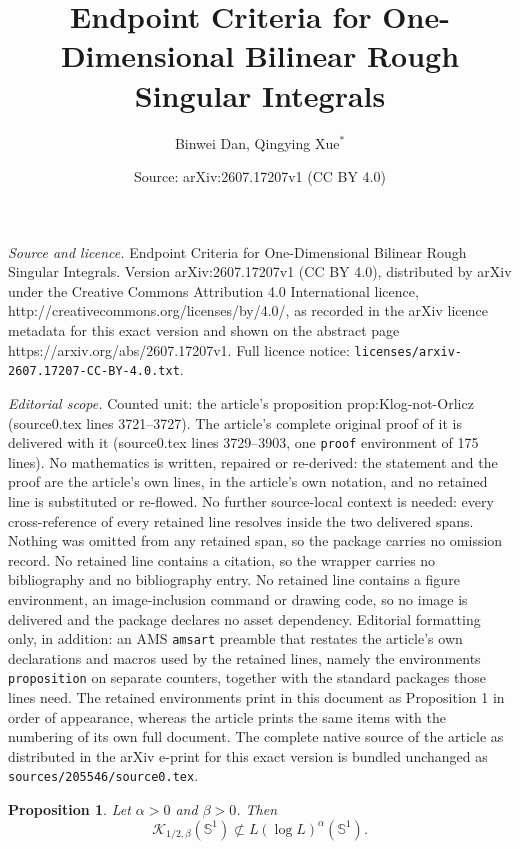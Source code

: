 \documentclass[10pt,a4paper]{amsart}
\title{Endpoint Criteria for One-Dimensional Bilinear Rough Singular Integrals}
\author{Binwei Dan, Qingying Xue\(^{*}\)}
\date{Source: arXiv:2607.17207v1 (CC BY 4.0)}
\newtheorem{proposition}{Proposition}
\newcommand{\Sph}{\mathbb S^1}
\newcommand{\cK}{\mathcal K}
\begin{document}
\maketitle

\noindent\emph{Source and licence.} Endpoint Criteria for One-Dimensional Bilinear Rough Singular Integrals. Version arXiv:2607.17207v1 (CC BY 4.0), distributed by arXiv under the Creative Commons Attribution 4.0 International licence, http://creativecommons.org/licenses/by/4.0/, as recorded in the arXiv licence metadata for this exact version and shown on the abstract page https://arxiv.org/abs/2607.17207v1. Full licence notice: \texttt{licenses/arxiv-2607.17207-CC-BY-4.0.txt}.\par\smallskip

\noindent\textit{Editorial scope.} Counted unit: the article's proposition prop:Klog-not-Orlicz (source0.tex lines 3721--3727). The article's complete original proof of it is delivered with it (source0.tex lines 3729--3903, one \texttt{proof} environment of 175 lines). No mathematics is written, repaired or re-derived: the statement and the proof are the article's own lines, in the article's own notation, and no retained line is substituted or re-flowed.  No further source-local context is needed: every cross-reference of every retained line resolves inside the two delivered spans.  Nothing was omitted from any retained span, so the package carries no omission record.  No retained line contains a citation, so the wrapper carries no bibliography and no bibliography entry.  No retained line contains a figure environment, an image-inclusion command or drawing code, so no image is delivered and the package declares no asset dependency.  Editorial formatting only, in addition: an AMS \texttt{amsart} preamble that restates the article's own declarations and macros used by the retained lines, namely the environments \texttt{proposition} on separate counters, together with the standard packages those lines need.  The retained environments print in this document as Proposition 1 in order of appearance, whereas the article prints the same items with the numbering of its own full document.  The complete native source of the article as distributed in the arXiv e-print for this exact version is bundled unchanged as \texttt{sources/205546/source0.tex}.
	\begin{proposition}\label{prop:Klog-not-Orlicz}
		Let \(\alpha>0\) and \(\beta>0\). Then
		\[
		\cK_{1/2,\beta}(\Sph)\not\subset
		L(\log L)^\alpha(\Sph).
		\]
	\end{proposition}
\end{document}
